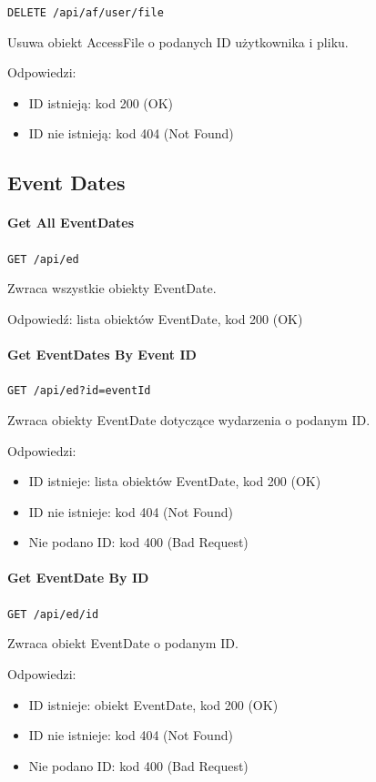 \documentclass[a4paper,twoside,12pt]{book}
\begin{document}
\texttt{DELETE /api/af/{user}/{file}}

Usuwa obiekt AccessFile o podanych ID użytkownika i pliku.

Odpowiedzi: 
\begin{itemize}
	\item ID istnieją: kod 200 (OK) 
	\item ID nie istnieją: kod 404 (Not Found)
\end{itemize}

\subsection{Event Dates}

\paragraph{Get All EventDates}

\texttt{GET /api/ed}

Zwraca wszystkie obiekty EventDate.

Odpowiedź: lista obiektów EventDate, kod 200 (OK)

\paragraph{Get EventDates By Event ID}

\texttt{GET /api/ed?id={eventId}}

Zwraca obiekty EventDate dotyczące wydarzenia o podanym ID.

Odpowiedzi: 
\begin{itemize}
	\item ID istnieje: lista obiektów EventDate, kod 200 (OK) 
	\item ID nie istnieje: kod 404 (Not Found) 
	\item Nie podano ID: kod 400 (Bad Request)
\end{itemize}

\paragraph{Get EventDate By ID}

\texttt{GET /api/ed/{id}}

Zwraca obiekt EventDate o podanym ID.

Odpowiedzi: 
\begin{itemize}
	\item ID istnieje: obiekt EventDate, kod 200 (OK) 
	\item ID nie istnieje: kod 404 (Not Found) 
	\item Nie podano ID: kod 400 (Bad Request)
\end{itemize}
\end{document}
